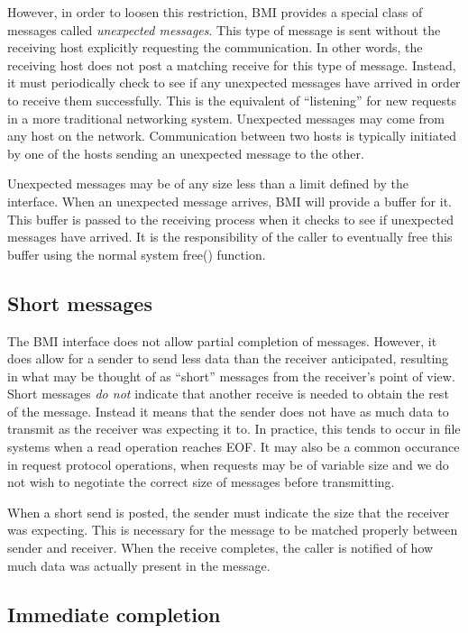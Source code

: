 \documentclass[11pt]{article}
\begin{document}
However, in order to loosen this restriction, 
BMI provides a special class of messages called \emph{unexpected
messages}.   This type of message is sent without the receiving host 
explicitly requesting the communication. 
In other
words, the receiving host does not post a matching receive for this
type of message.  Instead, it must periodically check to see if any
unexpected messages have arrived in order to receive them successfully.
This is the equivalent of ``listening'' for new requests in a more
traditional
networking system.  Unexpected messages may come from any host on the
network.  Communication between two hosts is typically initiated
by one of the hosts sending an unexpected message to the other. 

Unexpected messages may be of any size less than a limit defined by the
interface.  When an unexpected message arrives, BMI will provide a
buffer for it.  This buffer is passed to the receiving process when it
checks to see if unexpected messages have arrived.  It is the
responsibility of the caller to eventually free this buffer using
the normal system free() function.

\subsection{Short messages}
\label{sec:short}

The BMI interface does not allow partial completion of messages.
However, it does allow for a sender to send less data than
the receiver anticipated, resulting in what may be thought of as
``short'' messages from the receiver's point of view.  Short
messages \emph{do not} indicate that another receive is needed to
obtain the rest of the message.  Instead it means that the
sender does not have as much data to transmit as the receiver was
expecting it to.  In practice, this tends to occur in file systems
when a read operation reaches EOF.  It may also be a common
occurance in request protocol operations, when requests may be of
variable size and we do not wish to negotiate the correct size of
messages before transmitting.

When a short send is posted, the sender must indicate the size
that the receiver was expecting.  This is necessary for the
message to be matched properly between sender and receiver.  When
the receive completes, the caller is notified of how much data was
actually present in the message.

\subsection{Immediate completion}
\end{document}
